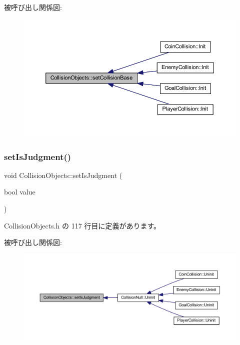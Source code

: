 被呼び出し関係図\+:\nopagebreak
\begin{figure}[H]
\begin{center}
\leavevmode
\includegraphics[width=350pt]{class_collision_objects_a144f0c9160c0dda1579c26a0726fdbb6_icgraph}
\end{center}
\end{figure}
\mbox{\label{class_collision_objects_a61e67c1c0ea20a01d9e4a5b2d1b45428}} 
\subsubsection{\texorpdfstring{set\+Is\+Judgment()}{setIsJudgment()}}
{\footnotesize\ttfamily void Collision\+Objects\+::set\+Is\+Judgment (\begin{DoxyParamCaption}\item[{bool}]{value }\end{DoxyParamCaption})\hspace{0.3cm}{\ttfamily [inline]}}



 Collision\+Objects.\+h の 117 行目に定義があります。

被呼び出し関係図\+:\nopagebreak
\begin{figure}[H]
\begin{center}
\leavevmode
\includegraphics[width=350pt]{class_collision_objects_a61e67c1c0ea20a01d9e4a5b2d1b45428_icgraph}
\end{center}
\end{figure}
\mbox{\label{class_collision_objects_a3d5a69741d66dcdebfae5a54a15c4b88}} 
